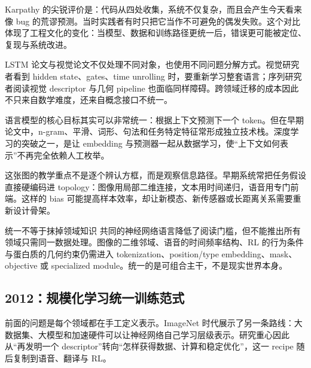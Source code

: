 Karpathy 的尖锐评价是：代码从四处收集，系统不仅复杂，而且会产生今天看来像 bug 的荒谬预测。当时实践者有时只把它当作不可避免的偶发失败。这个对比体现了工程文化的变化：当模型、数据和训练路径更统一后，错误更可能被定位、复现与系统改进。


LSTM 论文与视觉论文不仅处理不同对象，也使用不同问题分解方式。视觉研究者看到 hidden state、gates、time unrolling 时，要重新学习整套语言；序列研究者阅读视觉 descriptor 与几何 pipeline 也面临同样障碍。跨领域迁移的成本因此不只来自数学难度，还来自概念接口不统一。


语言模型的核心目标其实可以非常统一：根据上下文预测下一个 token。但在早期论文中，n-gram、平滑、词形、句法和任务特定特征常形成独立技术栈。深度学习的突破之一，是让 embedding 与预测器一起从数据学习，使“上下文如何表示”不再完全依赖人工枚举。


这张图的教学重点不是逐个辨认方框，而是观察信息路径。早期系统常把任务假设直接硬编码进 topology：图像用局部二维连接，文本用时间递归，语音用专门前端。这样的 bias 可能提高样本效率，却让新模态、新传感器或长距离关系需要重新设计骨架。


\begin{warningbox}{统一不等于抹掉领域知识}
共同的神经网络语言降低了阅读门槛，但不能推出所有领域只需同一数据处理。图像的二维邻域、语音的时间频率结构、RL 的行为条件与蛋白质的几何约束仍需进入 tokenization、position/type embedding、mask、objective 或 specialized module。统一的是可组合主干，不是现实世界本身。
\end{warningbox}

\subsection{2012：规模化学习统一训练范式}

前面的问题是每个领域都在手工定义表示。ImageNet 时代展示了另一条路线：大数据集、大模型和加速硬件可以让神经网络自己学习层级表示。研究重心因此从“再发明一个 descriptor”转向“怎样获得数据、计算和稳定优化”，这一 recipe 随后复制到语音、翻译与 RL。

